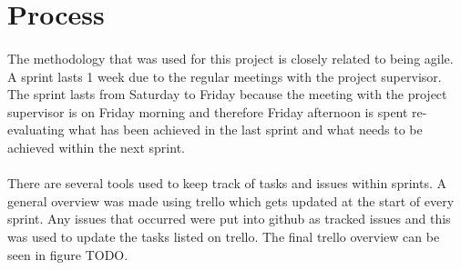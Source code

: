 
\section{Process}
\paragraph{}
The methodology that was used for this project is closely related to being agile. A sprint lasts 1 week due to the regular meetings with the project supervisor. The sprint lasts from Saturday to Friday because the meeting with the project supervisor is on Friday morning and therefore Friday afternoon is spent re-evaluating what has been achieved in the last sprint and what needs to be achieved within the next sprint.
\paragraph{}
There are several tools used to keep track of tasks and issues within sprints. A general overview was made using trello which gets updated at the start of every sprint. Any issues that occurred were put into github as tracked issues and this was used to update the tasks listed on trello. The final trello overview can be seen in figure TODO.

